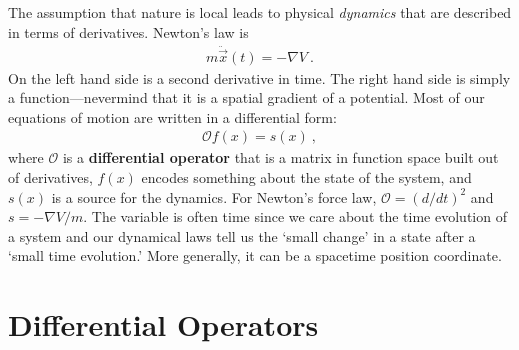 \documentclass[12pt, oneside]{report}    %
\let\oldsection\section
\def\section{%
  \setcounter{sidenote}{1}%
  \oldsection
}
\begin{document}



The assumption that nature is local leads to physical \emph{dynamics} that are described in terms of derivatives. Newton's law is 
\begin{align}
    m \ddot{\vec{x}} (t) = -\nabla V \ .
\end{align}
On the left hand side is a second derivative in time. The right hand side is simply a function---nevermind that it is a spatial gradient of a potential. Most of our equations of motion are written in a differential form:
\begin{align}
    \mathcal O f(x) = s(x) \ ,
\end{align}
where $\mathcal O$ is a \textbf{differential operator} that is a matrix in function space built out of derivatives, $f(x)$ encodes something about the state of the system, and $s(x)$ is a source for the dynamics. For Newton's force law, $\mathcal O = (d/dt)^2$ and $s=-\nabla V/m$. The variable is often time since we care about the time evolution of a system and our dynamical laws tell us the `small change' in a state after a `small time evolution.' More generally, it can be a spacetime position coordinate.



\section{Differential Operators}
\end{document}
